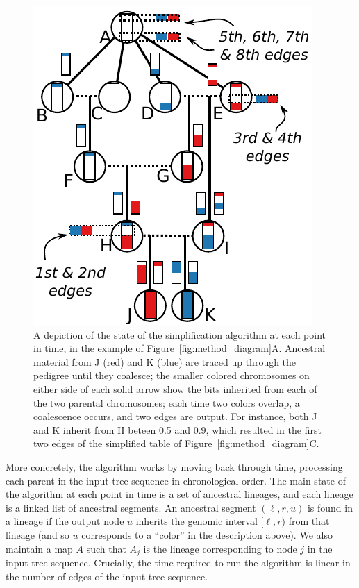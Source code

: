 \documentclass{article}
\begin{document}
\begin{figure}
    \begin{center}
        \includegraphics{simplify-state-diagram}
    \end{center}
    \caption{
        A depiction of the state of the simplification algorithm
        at each point in time,
        in the example of Figure~\ref{fig:method_diagram}A.
        Ancestral material from J (red) and K (blue) are traced up through the pedigree
        until they coalesce;
        the smaller colored chromosomes on either side of each solid arrow show the bits inherited from each of the two parental chromosomes;
        each time two colors overlap, a coalescence occurs, and two edges are output.
        For instance, both J and K inherit from H beteen 0.5 and 0.9,
        which resulted in the first two edges of the simplified table of Figure~\ref{fig:method_diagram}C.
        \label{fig:simplify_state}
    }
\end{figure}

More concretely,
the algorithm works by moving back through time,
processing each parent in the input tree sequence in chronological order.
The main state of the algorithm at each point in time is a set of ancestral lineages,
and each lineage is a linked list of ancestral segments.
An ancestral segment $(\ell, r, u)$ is found in a lineage
if the output node $u$ inherits the genomic interval $[\ell, r)$ from that lineage
(and so $u$ corresponds to a ``color'' in the description above).
We also maintain a map $A$ such that $A_j$ is the lineage
corresponding to node $j$ in the input tree sequence.
Crucially, the time required to run the algorithm is
linear in the number of edges of the input tree sequence.
\end{document}

